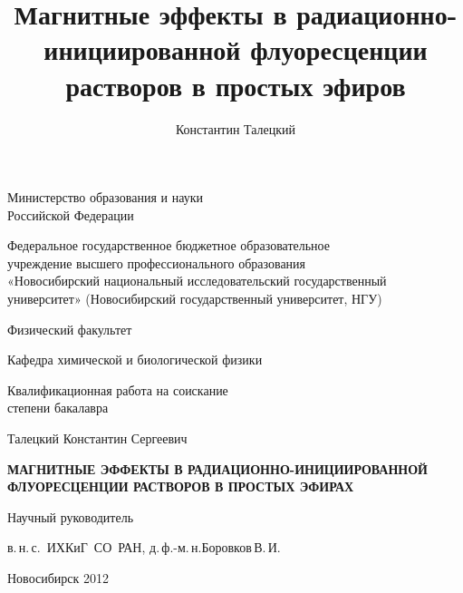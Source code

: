 \documentclass[14pt,titlepage]{extarticle}
\title{
  Магнитные эффекты в радиационно-инициированной флуоресценции растворов в простых эфиров
}
\author{
  Константин Талецкий
}
\begin{document}
\thispagestyle{empty}

  \begin{center}
    

    Министерство образования и науки\\
    Российской Федерации

    \vspace{0.7cm}
    Федеральное государственное бюджетное образовательное\\
    учреждение высшего профессионального образования\\
    «Новосибирский национальный исследовательский государственный\\
    университет» (Новосибирский государственный университет, НГУ)

    \vspace{0.7cm}

    Физический факультет

    \vspace{0.2cm}

    Кафедра химической и биологической физики

    \vspace{1.2cm}

    Квалификационная работа на соискание\\
    степени бакалавра

    \vspace{0.2cm}

    Талецкий Константин Сергеевич

    \vspace{1.5cm}

    \textbf{МАГНИТНЫЕ ЭФФЕКТЫ В РАДИАЦИОННО-ИНИЦИИРОВАННОЙ\\ ФЛУОРЕСЦЕНЦИИ РАСТВОРОВ В ПРОСТЫХ ЭФИРАХ}

    \vspace{2.5cm}

    \begin{flushright}

      Научный руководитель

      в.\,н.\,с.~ИХКиГ~СО~РАН, д.\,ф.-м.\,н.Боровков\,В.\,И.

    \end{flushright}

    \vspace {3cm}

    Новосибирск 2012

  \end{center}


\newpage
\tableofcontents
\end{document}
